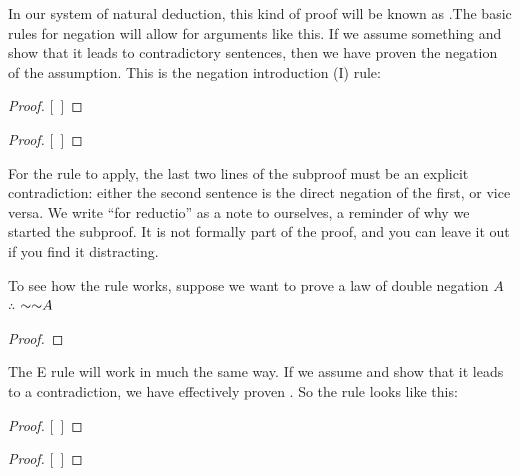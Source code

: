 In our system of natural deduction, this kind of proof will be known as .The basic rules for negation will allow for arguments like this. If we assume something and show that it leads to contradictory sentences, then we have proven the negation of the assumption. This is the negation introduction ({\enot}I) rule:

\begin{multicols}{2}

\begin{proof}
\open
\close
{}[\ ]{\enot{}}
\end{proof}

\begin{proof}
\open
\close
{}[\ ]{\enot{}}
\end{proof}

\end{multicols}


For the rule to apply, the last two lines of the subproof must be an explicit contradiction: either the second sentence is the direct negation of the first, or vice versa. We write ``for 
reductio'' as a note to ourselves, a reminder of why we started the subproof. It is not formally part of the proof, and you can leave it out if you find it distracting.

To see how the rule works, suppose we want to prove a law of double negation $A$ $\therefore$ $\mathord{\sim} \mathord{\sim} A$
\label{DN1}

\begin{proof}
 
	\open
	 
	 
	 
	\close
{} 
\end{proof}

The {\enot}E rule will work in much the same way. If we assume \enot{} and show that it leads to a contradiction, we have effectively proven . So the rule looks like this:

\begin{multicols}{2}
\begin{proof}
\open
\close
{}[\ ]{}
\end{proof}


\begin{proof}
\open
\close
{}[\ ]{}

\end{proof}
\end{multicols}

